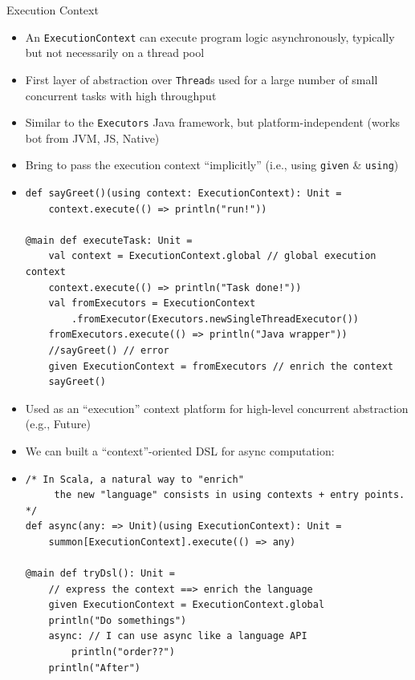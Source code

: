 \documentclass[presentation, 9pt]{beamer}\mode<presentation>{\usetheme{AMSBolognaFC}}
\begin{document}
\begin{frame}{Execution Context}
	\begin{itemize}
		\item An \texttt{ExecutionContext} can execute program logic asynchronously, typically but not necessarily on a thread pool
		\item First layer of abstraction over \texttt{Thread}s used for a large number of small concurrent tasks with high
		throughput
  	\item Similar to the \texttt{Executors} Java framework, but platform-independent (works bot from JVM, JS, Native)
   	\item Bring to pass the execution context ``implicitly'' (i.e., using \texttt{given} \& {\color{darkgreen}\texttt{using}}) 
		 \item[] \begin{tcolorbox}[left=0pt, top=0pt, bottom=0pt]
			\begin{verbatim}
def sayGreet()(using context: ExecutionContext): Unit =
	context.execute(() => println("run!"))

@main def executeTask: Unit =
	val context = ExecutionContext.global // global execution context
	context.execute(() => println("Task done!"))
	val fromExecutors = ExecutionContext
		.fromExecutor(Executors.newSingleThreadExecutor())
	fromExecutors.execute(() => println("Java wrapper"))
	//sayGreet() // error
	given ExecutionContext = fromExecutors // enrich the context
	sayGreet()
			\end{verbatim}
		\end{tcolorbox}
	\end{itemize}
	\framebreak
	\begin{itemize}
		\item Used as an ``execution'' context platform for high-level concurrent abstraction (e.g., Future)
  	\item We can built a ``context''-oriented DSL for async computation:
		\item[] \begin{tcolorbox}[left=0pt, top=0pt, bottom=0pt]
			\begin{verbatim}
/* In Scala, a natural way to "enrich" 
	 the new "language" consists in using contexts + entry points.
*/
def async(any: => Unit)(using ExecutionContext): Unit =
	summon[ExecutionContext].execute(() => any)

@main def tryDsl(): Unit =
	// express the context ==> enrich the language
	given ExecutionContext = ExecutionContext.global
	println("Do somethings")
	async: // I can use async like a language API
		println("order??")
	println("After")
			\end{verbatim}
		\end{tcolorbox}
	\end{itemize}
\end{frame}
\end{document}
